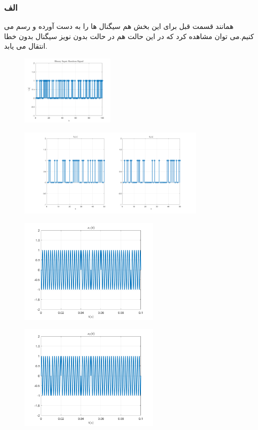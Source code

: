 \documentclass[a4paper]{article}
\begin{document}
	\subsubsection*{الف}
	همانند قسمت قبل برای این بخش هم سیگنال ها را به دست آورده و رسم می کنیم.می توان مشاهده کرد که در این حالت هم در حالت بدون نویز سیگنال بدون خطا انتقال می یابد.
	\newline
	\begin{figure}[H]
		\includegraphics[width=0.4\textwidth]{comsys_fig19.png}\\ 
		\centering
	\end{figure}\begin{figure}[H]
	\includegraphics[width=0.8\textwidth]{comsys_fig20.png}\\ 
	\centering
	\end{figure}\begin{figure}[H]
	\includegraphics[width=0.6\textwidth]{comsys_fig21.png}\\ 
	\centering
	\end{figure}\begin{figure}[H]
	\includegraphics[width=0.6\textwidth]{comsys_fig22.png}\\ 
	\centering
	\end{figure}
\end{document}
